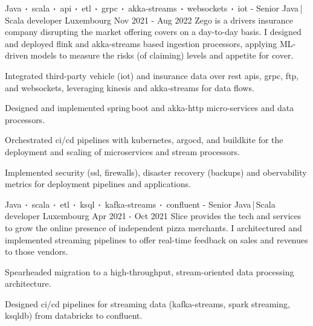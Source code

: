 \begin{cventries}

    \cventry
    {Java$\sqbig$scala$\sqbig$api$\sqbig$etl$\sqbig$grpc$\sqbig$akka-streams$\sqbig$websockets$\sqbig$iot}
    { - Senior Java\,|\,Scala developer}
    {Luxembourg}
    {Nov 2021 - Aug 2022}
    {Zego is a drivers insurance company disrupting the market offering covers on a day-to-day basis. I designed and deployed flink and akka-streams based ingestion processors, applying ML-driven models to measure the risks (of claiming) levels and appetite for cover.}
    {
        \begin{cvitems}
            \item{Integrated third-party vehicle (iot) and insurance data over rest apis, grpc, ftp, and websockets, leveraging kinesis and akka-streams for data flows.}
            \item{Designed and implemented spring\,boot and akka-http micro-services and data processors.}
            \item{Orchestrated ci/cd pipelines with kubernetes, argocd, and buildkite for the deployment and scaling of microservices and stream processors.}
            \item{Implemented security (ssl, firewalls), disaster recovery (backups) and obervability metrics for deployment pipelines and applications.}
        \end{cvitems}
    }


    \cventry
    {Java$\sqbig$scala$\sqbig$etl$\sqbig$ksql$\sqbig$kafka-streams$\sqbig$confluent}
    { - Senior Java\,|\,Scala developer}
    {Luxembourg}
    {Apr 2021 - Oct 2021}
    {Slice provides the tech and services to grow the online presence of independent pizza merchants. I architectured and implemented streaming pipelines to offer real-time feedback on sales and revenues to those vendors.}
    {
        \begin{cvitems}
            \item{Spearheaded migration to a high-throughput, stream-oriented data processing architecture.}
            \item{Designed ci/cd pipelines for streaming data (kafka-streams, spark streaming, ksqldb) from databricks to confluent.}
        \end{cvitems}
    }


\end{cventries}
